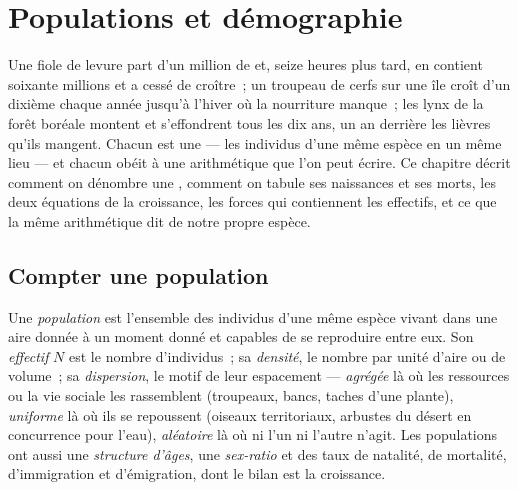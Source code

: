 \chapter{Populations et démographie}\label{ch:b1:populations}

Une fiole de levure part d'un million de  et, seize heures plus
tard, en contient soixante millions et a cessé de croître~; un troupeau
de cerfs sur une île croît d'un dixième chaque année jusqu'à l'hiver où
la nourriture manque~; les lynx de la forêt boréale montent et
s'effondrent tous les dix ans, un an derrière les lièvres qu'ils
mangent. Chacun est une \emph{} --- les individus d'une même
espèce en un même lieu --- et chacun obéit à une arithmétique que l'on
peut écrire. Ce chapitre décrit comment on dénombre une ,
comment on tabule ses naissances et ses morts, les deux équations de la
croissance, les forces qui contiennent les effectifs, et ce que la même
arithmétique dit de notre propre espèce.

\section{Compter une population}

\begin{definition}\label{def:b1:populations:population}
Une \emph{population} est l'ensemble des individus d'une même espèce
vivant dans une aire donnée à un moment donné et capables de se
reproduire entre eux. Son \emph{effectif} $N$ est le nombre
d'individus~; sa \emph{densité}, le nombre par unité d'aire ou de
volume~; sa \emph{dispersion}, le motif de leur espacement ---
\emph{agrégée} là où les ressources ou la vie sociale les rassemblent
(troupeaux, bancs, taches d'une plante), \emph{uniforme} là où ils se
repoussent (oiseaux territoriaux, arbustes du désert en concurrence
pour l'eau), \emph{aléatoire} là où ni l'un ni l'autre n'agit. Les
populations ont aussi une \emph{structure d'âges}, une \emph{sex-ratio}
et des taux de natalité, de mortalité, d'immigration et d'émigration,
dont le bilan est la croissance.
\end{definition}

